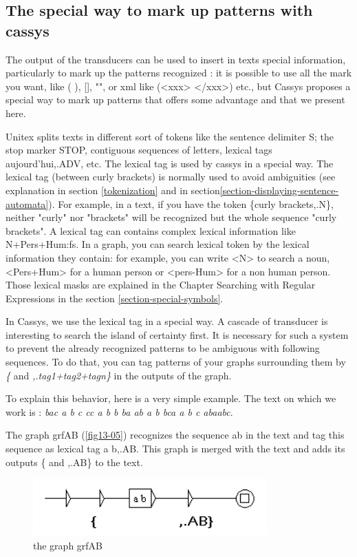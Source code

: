 \subsection{The special way to mark up patterns with cassys}

The output of the transducers can be used to insert in texts special information, particularly to mark up the patterns recognized : it is 
possible to use all the mark you want, like ( ), [], "", or xml like (<xxx> </xxx>) etc., but Cassys proposes a special way to 
mark up patterns that offers some advantage and that we present here.  

\bigskip
\noindent Unitex splits texts in different sort of tokens like the sentence delimiter {S}; the stop marker {STOP}, contiguous 
sequences of letters, lexical tags {aujourd'hui,.ADV}, etc. The lexical tag is used by cassys in a special way. The lexical tag (between curly brackets) is normally used to avoid ambiguities (see explanation in section \ref{tokenization} and in section\ref{section-displaying-sentence-automata}). 
For example, in a text, if you have the token \{curly brackets,.N\}, neither "curly" nor "brackets" will be recognized but the whole sequence 
"curly brackets". A lexical tag can contains complex lexical information like N+Pers+Hum:fs.
In a graph, you can search lexical token by the lexical information they contain: for example, you can write <N> to search 
a noun, <Pers+Hum> for a human person or <pers-Hum> for a non human person. Those lexical masks are explained in the Chapter Searching with Regular Expressions in the section \ref{section-special-symbols}.
 
\bigskip
\noindent In Cassys, we use the lexical tag in a special way. A cascade of transducer is interesting to search the island of certainty first. It is necessary for such a system to prevent the already recognized patterns to be ambiguous with following sequences. To do that, you can tag patterns of your graphs surrounding them by \emph{\{} and \emph{,.tag1+tag2+tagn\}} in the outputs of the graph.

\bigskip
\noindent To explain this behavior, here is a very simple example. The text on which we work is :
\emph{bac a b c cc a b b ba ab a b bca a b c abaabc}.

\bigskip
\noindent The graph grfAB (\ref{fig13-05}) recognizes the sequence ab in the text and tag this sequence as lexical tag {a b,.AB}. This graph is merged with the text and adds its outputs \{ and ,.AB\} to the text. 

\begin{figure}[!htb]
  \centering
  \includegraphics[width=9cm]{resources/img/fig13-05.png}
  \caption{the graph grfAB}
  \label{fig:fig13-05}
\end{figure}

